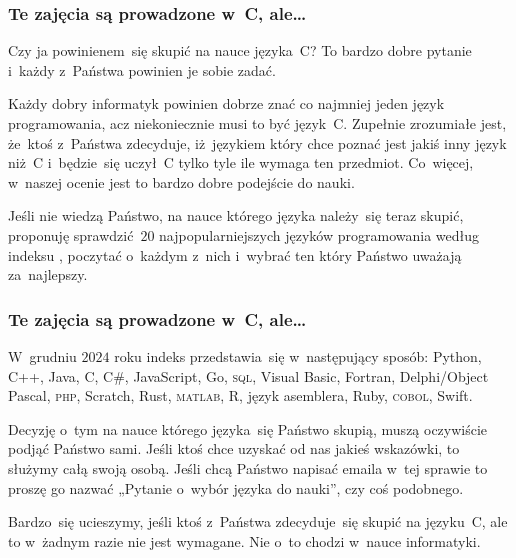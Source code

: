 \documentclass[10pt,t]{beamer}
\begin{document}
\begin{frame}
  \frametitle{Te zajęcia są prowadzone w~C, ale\ldots}


  Czy ja powinienem~się skupić na nauce języka~C? To bardzo dobre
  pytanie i~każdy z~Państwa powinien je sobie zadać.

  Każdy dobry informatyk powinien dobrze znać co najmniej jeden język
  programowania, acz niekoniecznie musi to być język~C. Zupełnie zrozumiałe
  jest, że~ktoś z~Państwa zdecyduje, iż~językiem który chce poznać jest
  jakiś inny język niż~C i~będzie~się uczył~C tylko tyle ile wymaga ten
  przedmiot. Co~więcej, w~naszej ocenie jest to bardzo dobre podejście do
  nauki.

  Jeśli nie wiedzą Państwo, na nauce którego języka należy~się teraz skupić,
  proponuję sprawdzić~$20$ najpopularniejszych języków programowania
  według indeksu
  ,
  poczytać o~każdym z~nich i~wybrać ten który Państwo uważają za~najlepszy.

\end{frame}





\begin{frame}
  \frametitle{Te zajęcia są prowadzone w~C, ale\ldots}


  W~grudniu $2024$ roku indeks
  przedstawia~się w~następujący sposób: Python, C++, Java, C, C\#,
  JavaScript, Go, \textsc{sql}, Visual Basic, Fortran, Delphi/Object
  Pascal, \textsc{php}, Scratch, Rust, \textsc{matlab}, R, język asemblera,
  Ruby, \textsc{cobol}, Swift.

  Decyzję o~tym na nauce którego języka~się Państwo skupią, muszą
  oczywiście podjąć Państwo sami. Jeśli ktoś chce uzyskać od nas jakieś
  wskazówki, to służymy całą swoją osobą. Jeśli chcą Państwo napisać emaila
  w~tej sprawie to proszę go nazwać „Pytanie o~wybór języka do nauki”, czy
  coś podobnego.

  Bardzo~się ucieszymy, jeśli ktoś z~Państwa zdecyduje~się skupić na
  języku~C, ale to w~żadnym razie nie jest wymagane. Nie o~to chodzi w~nauce
  informatyki.

\end{frame}
\end{document}

